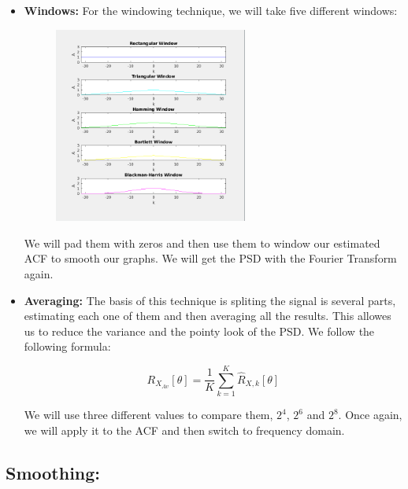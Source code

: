 \documentclass[a4paper,11pt]{article}
\begin{document}
\begin{itemize}
  \item \textbf{Windows:}
  For the windowing technique, we will take five different windows:

  \begin{figure}[!hp]
      \begin{center}
        \includegraphics[width=0.6\textwidth]{images/study2/windows2.png}
      \end{center}
  \end{figure}

  We will pad them with zeros and then use them to window our estimated ACF to
  smooth our graphs. We will get the PSD with the Fourier Transform again.

  \item \textbf{Averaging:}
  The basis of this technique is spliting the signal is several parts,
  estimating each one of them and then averaging all the results. This allowes
  us to reduce the variance and the pointy look of the PSD. We follow the
  following formula:

  \begin{equation}\label{eq:Averaging}
    R_{X_{Av}}[\theta] = \displaystyle\frac{1}{K} \displaystyle\sum_{k=1}^{K} \hat{R}_{X,k}[\theta]
  \end{equation}

  We will use three different values to compare them, $2^4$, $2^6$ and $2^8$.
  Once again, we will apply it to the ACF and then switch to frequency domain.

\end{itemize}

\newpage

\subsection{Smoothing:}
\end{document}
